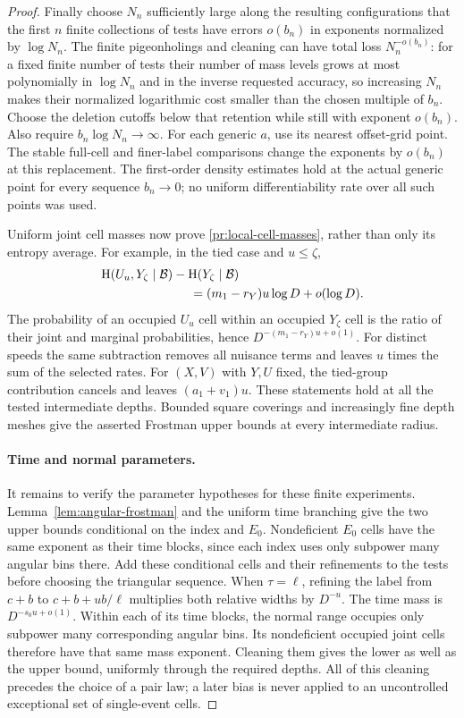 \begin{proof}
Finally choose $N_n$ sufficiently large along the resulting
configurations that the first $n$ finite collections of tests have
errors $o(b_n)$ in exponents normalized by $\log N_n$.
The finite pigeonholings and cleaning can have total loss
$N_n^{-o(b_n)}$: for a fixed finite number of tests their number of
mass levels grows at most polynomially in $\log N_n$ and in the
inverse requested accuracy, so increasing $N_n$ makes their
normalized logarithmic cost smaller than the chosen multiple of
$b_n$. Choose the deletion cutoffs below that retention while still
with exponent $o(b_n)$.
Also require $b_n\log N_n\to\infty$.
For each generic $a$, use its nearest offset-grid point.
The stable full-cell and finer-label comparisons change the
exponents by $o(b_n)$ at this replacement.
The first-order density estimates hold at the actual generic point
for every sequence $b_n\to0$; no uniform differentiability rate
over all such points was used.

Uniform joint cell masses now prove
\eqref{pr:local-cell-masses}, rather than only its entropy average.
For example, in the tied case and $u\le\zeta$,
\begin{align*}
 &\mathrm H( U_u,Y_\zeta\mid\mathcal B)
       -\mathrm H(Y_\zeta\mid\mathcal B)\\
 &\hspace{25mm}=(m_1-r_Y)u\log D+o(\log D).
\end{align*}
The probability of an occupied $U_u$ cell within an occupied
$Y_\zeta$ cell is the ratio of their joint and marginal
probabilities, hence $D^{-(m_1-r_Y)u+o(1)}$.
For distinct speeds the same subtraction removes all nuisance
terms and leaves $u$ times the sum of the selected rates.
For $(X,V)$ with $Y,U$ fixed, the tied-group contribution cancels
and leaves $(a_1+v_1)u$.
These statements hold at all the tested intermediate depths.
Bounded square coverings and increasingly fine depth meshes give
the asserted Frostman upper bounds at every intermediate radius.

\paragraph{Time and normal parameters.}
It remains to verify the parameter hypotheses for these finite
experiments. Lemma~\ref{lem:angular-frostman} and the uniform time
branching give the two upper bounds conditional on the index and
$E_0$. Nondeficient $E_0$ cells have the same exponent as their
time blocks, since each index uses only subpower many angular bins
there. Add these conditional cells and their refinements to the
tests before choosing the triangular sequence.
When $\tau=\ell$, refining the label from $c+b$ to
$c+b+ub/\ell$ multiplies both relative widths by $D^{-u}$.
The time mass is $D^{-s_0u+o(1)}$. Within each of its time blocks,
the normal range occupies only subpower many corresponding
angular bins. Its nondeficient occupied joint cells therefore have
that same mass exponent. Cleaning them gives the lower as well as
the upper bound, uniformly through the required depths.
All of this cleaning precedes the choice of a pair law; a later
bias is never applied to an uncontrolled exceptional set of
single-event cells.
\end{proof}

